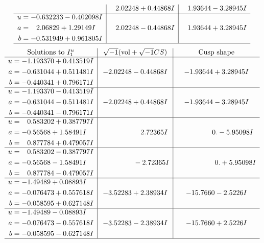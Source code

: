 \documentclass[1p]{elsarticle_modified}
\theoremstyle{definition}
\newcommand{\I}{\sqrt{-1}}
\begin{document}
$$\begin{array}{c|c|c}
 & \phantom{-}2.02248 + 0.44868 I & \phantom{-}1.93644 - 3.28945 I \\ \hline\begin{aligned}
u &= -0.632233 - 0.402098 I \\
a &= \phantom{-}2.06829 + 1.29149 I \\
b &= -0.531949 + 0.961805 I\end{aligned}
 & \phantom{-}2.02248 - 0.44868 I & \phantom{-}1.93644 + 3.28945 I\\
 \hline 
 \end{array}$$\newpage$$\begin{array}{c|c|c}  
\text{Solutions to }I^u_{1}& \I (\text{vol} + \sqrt{-1}CS) & \text{Cusp shape}\\
 \hline 
\begin{aligned}
u &= -1.193370 + 0.413519 I \\
a &= -0.631044 + 0.511481 I \\
b &= -0.440341 + 0.796171 I\end{aligned}
 & -2.02248 - 0.44868 I & -1.93644 + 3.28945 I \\ \hline\begin{aligned}
u &= -1.193370 - 0.413519 I \\
a &= -0.631044 - 0.511481 I \\
b &= -0.440341 - 0.796171 I\end{aligned}
 & -2.02248 + 0.44868 I & -1.93644 - 3.28945 I \\ \hline\begin{aligned}
u &= \phantom{-}0.583202 + 0.387797 I \\
a &= -0.56568 + 1.58491 I \\
b &= \phantom{-}0.877784 + 0.479057 I\end{aligned}
 & \phantom{-0.000000 -}2.72365 I & \phantom{-0.000000 } 0. - 5.95098 I \\ \hline\begin{aligned}
u &= \phantom{-}0.583202 - 0.387797 I \\
a &= -0.56568 - 1.58491 I \\
b &= \phantom{-}0.877784 - 0.479057 I\end{aligned}
 & \phantom{-0.000000 } -2.72365 I & \phantom{-0.000000 -}0. + 5.95098 I \\ \hline\begin{aligned}
u &= -1.49489 + 0.08893 I \\
a &= -0.076473 + 0.557618 I \\
b &= -0.058595 + 0.627148 I\end{aligned}
 & -3.52283 + 2.38934 I & -15.7660 - 2.5226 I \\ \hline\begin{aligned}
u &= -1.49489 - 0.08893 I \\
a &= -0.076473 - 0.557618 I \\
b &= -0.058595 - 0.627148 I\end{aligned}
 & -3.52283 - 2.38934 I & -15.7660 + 2.5226 I\\
 \hline 
 \end{array}$$\newpage\newpage\renewcommand{\arraystretch}{1}
\end{document}
